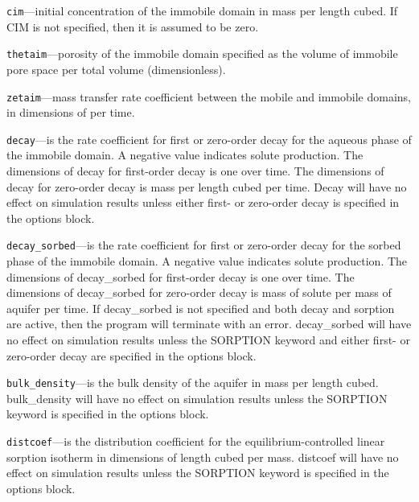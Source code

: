 \begin{description}
\item \texttt{cim}---initial concentration of the immobile domain in mass per length cubed.  If CIM is not specified, then it is assumed to be zero.

\item \texttt{thetaim}---porosity of the immobile domain specified as the volume of immobile pore space per total volume (dimensionless).

\item \texttt{zetaim}---mass transfer rate coefficient between the mobile and immobile domains, in dimensions of per time.

\item \texttt{decay}---is the rate coefficient for first or zero-order decay for the aqueous phase of the immobile domain.  A negative value indicates solute production.  The dimensions of decay for first-order decay is one over time.  The dimensions of decay for zero-order decay is mass per length cubed per time.  Decay will have no effect on simulation results unless either first- or zero-order decay is specified in the options block.

\item \texttt{decay\_sorbed}---is the rate coefficient for first or zero-order decay for the sorbed phase of the immobile domain.  A negative value indicates solute production.  The dimensions of decay\_sorbed for first-order decay is one over time.  The dimensions of decay\_sorbed for zero-order decay is mass of solute per mass of aquifer per time.  If decay\_sorbed is not specified and both decay and sorption are active, then the program will terminate with an error.  decay\_sorbed will have no effect on simulation results unless the SORPTION keyword and either first- or zero-order decay are specified in the options block.

\item \texttt{bulk\_density}---is the bulk density of the aquifer in mass per length cubed.  bulk\_density will have no effect on simulation results unless the SORPTION keyword is specified in the options block.

\item \texttt{distcoef}---is the distribution coefficient for the equilibrium-controlled linear sorption isotherm in dimensions of length cubed per mass.  distcoef will have no effect on simulation results unless the SORPTION keyword is specified in the options block.

\end{description}

